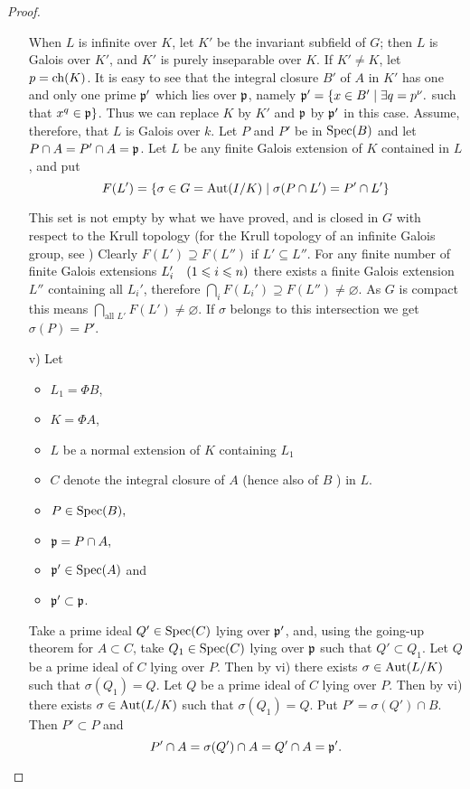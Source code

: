\documentclass[../main]{subfiles}
\begin{document}
\begin{proof}
\begin{enumerate}
  When $L$ is infinite over $K$, let $K'$ be the invariant subfield of $G$; then $L$ is Galois over $K'$, and $K'$ is purely inseparable over $K$. If $K' \neq K$, let $p=\operatorname{ch}(K)$. It is easy to see that the integral closure $B'$ of $A$ in $K'$ has one and only one prime $\mathfrak{p}'$ which lies over $\mathfrak{p}$, namely $\mathfrak{p}'=\{x \in B' \mid \exists q=p^\nu.$ such that $x^q \in \mathfrak{p}\}$. Thus we can replace $K$ by $K'$ and $\mathfrak{p}$ by $\mathfrak{p}'$ in this case. Assume, therefore, that ${L}$ is Galois over ${k}$. Let $P$ and $P'$ be in $\operatorname{Spec}(B)$ and let $P \cap A=P' \cap A= \mathfrak{p}$. Let $L$ be any finite Galois extension of ${K}$ contained in ${L}$, and put \[F(L')=\{\sigma \in G=\operatorname{Aut}(I / K) \mid \sigma(P \cap L')=P' \cap L'\}\]

This set is not empty by what we have proved, and is closed in $G$ with respect to the Krull topology (for the Krull topology of an infinite Galois group, see \cite[p.233 exercise 19.]{lang2012algebra}) Clearly $F(L') \supseteq F(L'')$ if $L' \subseteq L''$. For any finite number of finite Galois extensions $L'_i\for{1 \leqslant i \leqslant n}$ there exists a finite Galois extension $L''$ containing all $L_i'$, therefore \newline $\bigcap_i F(L_i') \supseteq F(L'') \neq \varnothing$. As $G$ is compact this means $\bigcap_{\text{all } L'} F(L') \neq \varnothing$. If $\sigma$ belongs to this intersection we get $\sigma({P})={P}'$.
\item[v)]Let 
\begin{itemize}
    \item ${L}_1=\Phi {B}$,
    \item $ {K}=\Phi {A}$,
    \item ${L}$ be a normal extension of $K$ containing $L_1$
    \item $C$ denote the integral closure of $A$ (hence also of $B$ ) in $L$.
    \item $P \in \operatorname{Spec}(B),$
    \item $\mathfrak{p}=P \cap A,$
    \item $\mathfrak{p}' \in \operatorname{Spec}(A)$ and
    \item $\mathfrak{p}' \subset \mathfrak{p}$.
\end{itemize}
Take a prime ideal $Q' \in \operatorname{Spec}(C)$ lying over $\mathfrak{p}'$, and, using the going-up theorem for $A \subset C$, take $Q_1 \in \operatorname{Spec}(C)$ lying over $\mathfrak{p}$ such that $Q' \subset Q_1$.  Let $Q$ be a prime ideal of $C$ lying over $P$. Then by vi) there exists \newline $\sigma \in\operatorname{Aut}({L} / {K})$ such that $\sigma(Q_1)=Q$. Let $Q$ be a prime ideal of $C$ lying over $P$. Then by vi) there exists $\sigma \in \operatorname{Aut}(L/K)$ such that $\sigma (Q_1) = Q$. Put ${P}'=\sigma(Q') \cap B$. Then $P' \subset P$ and \[P' \cap A=\sigma(Q') \cap A=Q' \cap A=\mathfrak{p}'.\]

\end{enumerate}

\end{proof}
\end{document}
